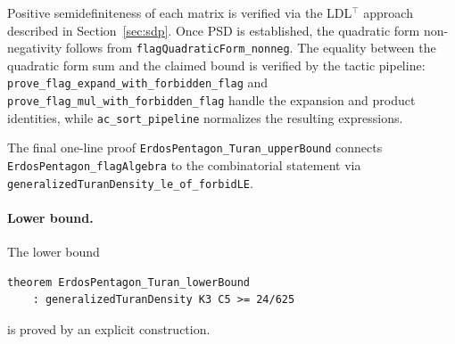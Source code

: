 \documentclass{article}
\newcommand{\lean}[1]{\texttt{#1}}
\begin{document}
Positive semidefiniteness of each matrix is verified via the LDL$^\top$
approach described in Section~\ref{sec:sdp}.  Once PSD is established, the
quadratic form non-negativity follows from
\lean{flagQuadraticForm\_nonneg}.  The equality between the quadratic form
sum and the claimed bound is verified by the tactic pipeline:
\lean{prove\_flag\_expand\_with\_forbidden\_flag} and
\lean{prove\_flag\_mul\_with\_forbidden\_flag} handle the expansion and
product identities, while \lean{ac\_sort\_pipeline} normalizes the resulting
expressions.

The final one-line proof \lean{ErdosPentagon\_Turan\_upperBound} connects
\lean{ErdosPentagon\_flagAlgebra} to the combinatorial statement via
\lean{generalizedTuranDensity\_le\_of\_forbidLE}.

\paragraph{Lower bound.}
The lower bound
\begin{lstlisting}
theorem ErdosPentagon_Turan_lowerBound
    : generalizedTuranDensity K3 C5 >= 24/625
\end{lstlisting}
is proved by an explicit construction.
\end{document}
